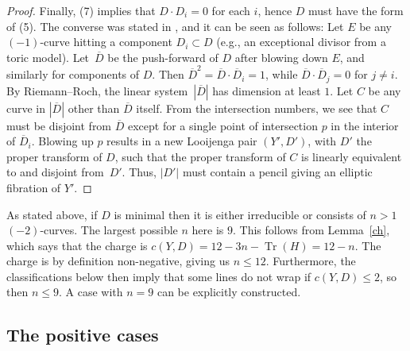 \documentclass[11pt]{article}
\numberwithin{equation}{section}
\numberwithin{figure}{section}
\numberwithin{table}{section}
\DeclareMathOperator{\Tr}{Tr}
\let\?=\overline
\theoremstyle{definition}
\begin{document}
\begin{proof}
Finally, (7) implies that $D\cdot D_i=0$ for each $i$, hence $D$ must have the form of (5). The converse was stated in \cite[Section~0.5.2, arXiv v1]{GHK1}, and it can be seen as follows: Let $E$ be any $(-1)$-curve hitting a component $D_i\subset D$ (e.g., an exceptional divisor from a toric model). Let~$\?{D}$ be the push-forward of $D$ after blowing down $E$, and similarly for components of $D$. Then $\?{D}^2=\?{D}\cdot \?{D}_i=1$, while $\?{D}\cdot \?{D}_j=0$ for $j\neq i$. By Riemann--Roch, the linear system~$|\?{D}|$ has dimension at least $1$. Let $C$ be any curve in $|\?{D}|$ other than $\?{D}$ itself. From the intersection numbers, we see that $C$ must be disjoint from $\?{D}$ except for a single point of intersection $p$ in the interior of $\?{D}_i$. Blowing up $p$ results in a new Looijenga pair $(Y',D')$, with $D'$ the proper transform of $D$, such that the proper transform of $C$ is linearly equivalent to and disjoint from~$D'$. Thus, $|D'|$ must contain a pencil giving an elliptic fibration of $Y'$.
\end{proof}

As stated above, if $D$ is minimal then it is either irreducible or consists of $n>1$ $(-2)$-curves. The largest possible $n$ here is $9$. This follows from Lemma~\ref{ch}, which says that the charge is $c(Y,D)=12-3n-\Tr(H)=12-n$. The charge is by definition non-negative, giving us $n\leq 12$. Furthermore, the classifications below then imply that some lines do not wrap if $c(Y,D)\leq 2$, so then $n\leq 9$. A case with $n=9$ can be explicitly constructed.

\subsection{The positive cases}\label{PositiveCase}
\end{document}
